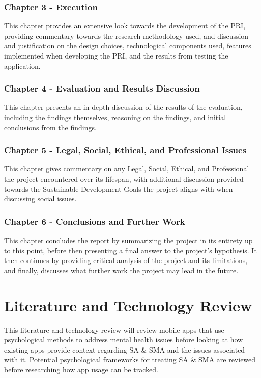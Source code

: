 \documentclass[12pt]{article}
\begin{document}
\subsubsection{Chapter 3 - Execution}
This chapter provides an extensive look towards the development of the PRI, providing commentary towards the research methodology
used, and discussion and justification on the design choices, technological components used, features implemented when developing the PRI, and
the results from testing the application.

\subsubsection{Chapter 4 - Evaluation and Results Discussion}
This chapter presents an in-depth discussion of the results of the evaluation, including the findings themselves, reasoning on the 
findings, and initial conclusions from the findings.

\subsubsection{Chapter 5 - Legal, Social, Ethical, and Professional Issues}
This chapter gives commentary on any Legal, Social, Ethical, and Professional the project encountered over its lifespan, with
additional discussion provided towards the Sustainable Development Goals the project aligns with when discussing social issues.

\subsubsection{Chapter 6 - Conclusions and Further Work}
This chapter concludes the report by summarizing the project in its entirety up to this point, before then presenting a final answer 
to the project's hypothesis. It then continues by providing critical analysis of the project and its limitations, and finally, discusses 
what further work the project may lead in the future.


\newpage



\section{Literature and Technology Review}
This literature and technology review will review mobile apps that use psychological methods to address mental 
health issues before looking at how existing apps provide context regarding SA \& SMA and
the issues associated with it. Potential psychological frameworks for treating SA \& SMA are reviewed 
before researching how app usage can be tracked.
\end{document}
